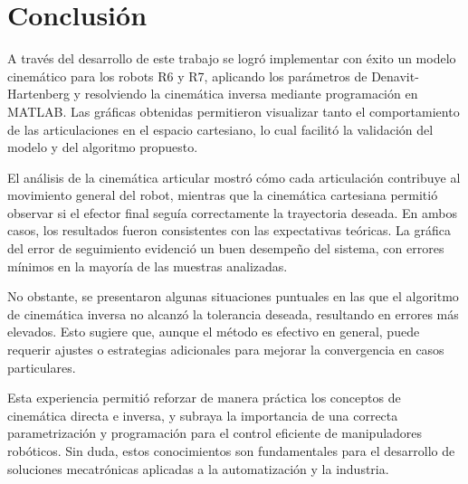 \section{Conclusión}
A través del desarrollo de este trabajo se logró implementar con éxito un modelo cinemático para los robots R6 y R7, aplicando los parámetros de Denavit-Hartenberg y resolviendo la cinemática inversa mediante programación en MATLAB. Las gráficas obtenidas permitieron visualizar tanto el comportamiento de las articulaciones en el espacio cartesiano, lo cual facilitó la validación del modelo y del algoritmo propuesto.

El análisis de la cinemática articular mostró cómo cada articulación contribuye al movimiento general del robot, mientras que la cinemática cartesiana permitió observar si el efector final seguía correctamente la trayectoria deseada. En ambos casos, los resultados fueron consistentes con las expectativas teóricas. La gráfica del error de seguimiento evidenció un buen desempeño del sistema, con errores mínimos en la mayoría de las muestras analizadas.

No obstante, se presentaron algunas situaciones puntuales en las que el algoritmo de cinemática inversa no alcanzó la tolerancia deseada, resultando en errores más elevados. Esto sugiere que, aunque el método es efectivo en general, puede requerir ajustes o estrategias adicionales para mejorar la convergencia en casos particulares.

Esta experiencia permitió reforzar de manera práctica los conceptos de cinemática directa e inversa, y subraya la importancia de una correcta parametrización y programación para el control eficiente de manipuladores robóticos. Sin duda, estos conocimientos son fundamentales para el desarrollo de soluciones mecatrónicas aplicadas a la automatización y la industria.







